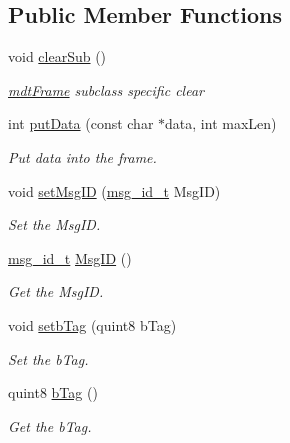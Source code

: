 \subsection*{Public Member Functions}
\begin{DoxyCompactItemize}
\item 
\hypertarget{classmdt_frame_usb_tmc_afb0b0e071e328b55ce8e2c73359153d6}{
void \hyperlink{classmdt_frame_usb_tmc_afb0b0e071e328b55ce8e2c73359153d6}{clearSub} ()}
\label{classmdt_frame_usb_tmc_afb0b0e071e328b55ce8e2c73359153d6}

\begin{DoxyCompactList}\small\item\em \hyperlink{classmdt_frame}{mdtFrame} subclass specific clear \end{DoxyCompactList}\item 
int \hyperlink{classmdt_frame_usb_tmc_a06d2743a113bd2b4cf2ee44014ecd710}{putData} (const char $\ast$data, int maxLen)
\begin{DoxyCompactList}\small\item\em Put data into the frame. \end{DoxyCompactList}\item 
void \hyperlink{classmdt_frame_usb_tmc_a19121b03cbb4c1bb420dc3cdb132f703}{setMsgID} (\hyperlink{classmdt_frame_usb_tmc_a10c2216157b0616b69f6cabc5c8e253b}{msg\_\-id\_\-t} MsgID)
\begin{DoxyCompactList}\small\item\em Set the MsgID. \end{DoxyCompactList}\item 
\hyperlink{classmdt_frame_usb_tmc_a10c2216157b0616b69f6cabc5c8e253b}{msg\_\-id\_\-t} \hyperlink{classmdt_frame_usb_tmc_add167ed246e03d6f2ef4e4a9855a9fae}{MsgID} ()
\begin{DoxyCompactList}\small\item\em Get the MsgID. \end{DoxyCompactList}\item 
void \hyperlink{classmdt_frame_usb_tmc_aff7b19ad83013402dd115089d31b8642}{setbTag} (quint8 bTag)
\begin{DoxyCompactList}\small\item\em Set the bTag. \end{DoxyCompactList}\item 
quint8 \hyperlink{classmdt_frame_usb_tmc_a660956348627e01fedfea0383e2b27e2}{bTag} ()
\begin{DoxyCompactList}\small\item\em Get the bTag. \end{DoxyCompactList}\item 

\end{DoxyCompactItemize}
